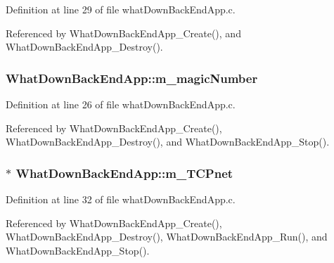 Definition at line 29 of file what\+Down\+Back\+End\+App.\+c.



Referenced by What\+Down\+Back\+End\+App\+\_\+\+Create(), and What\+Down\+Back\+End\+App\+\_\+\+Destroy().

\subsubsection[{\texorpdfstring{m\+\_\+magic\+Number}{m_magicNumber}}]{ What\+Down\+Back\+End\+App\+::m\+\_\+magic\+Number}\hypertarget{structWhatDownBackEndApp_a42c045ac45fba24457ecc2bed6b72551}{}\label{structWhatDownBackEndApp_a42c045ac45fba24457ecc2bed6b72551}


Definition at line 26 of file what\+Down\+Back\+End\+App.\+c.



Referenced by What\+Down\+Back\+End\+App\+\_\+\+Create(), What\+Down\+Back\+End\+App\+\_\+\+Destroy(), and What\+Down\+Back\+End\+App\+\_\+\+Stop().

\subsubsection[{\texorpdfstring{m\+\_\+\+T\+C\+Pnet}{m_TCPnet}}]{$\ast$ What\+Down\+Back\+End\+App\+::m\+\_\+\+T\+C\+Pnet}\hypertarget{structWhatDownBackEndApp_a31b8ae63bb41f8e6b231ddda0e67f612}{}\label{structWhatDownBackEndApp_a31b8ae63bb41f8e6b231ddda0e67f612}


Definition at line 32 of file what\+Down\+Back\+End\+App.\+c.



Referenced by What\+Down\+Back\+End\+App\+\_\+\+Create(), What\+Down\+Back\+End\+App\+\_\+\+Destroy(), What\+Down\+Back\+End\+App\+\_\+\+Run(), and What\+Down\+Back\+End\+App\+\_\+\+Stop().

